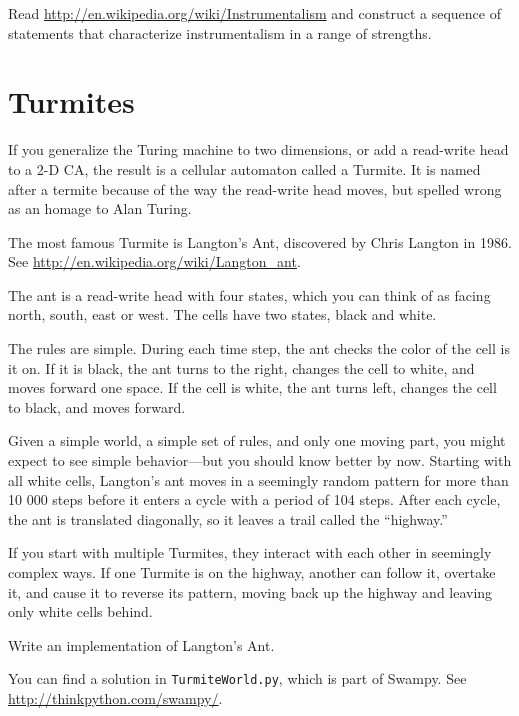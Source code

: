 \documentclass[10pt]{book}
\begin{document}
\begin{exercise}

Read \url{http://en.wikipedia.org/wiki/Instrumentalism}
and construct a sequence
of statements that characterize instrumentalism in a range of
strengths.

\end{exercise}


\section{Turmites}

If you generalize the Turing machine to two dimensions, or
add a read-write head to a 2-D CA, the result is a
cellular automaton called a Turmite.  It is named after a
termite because of the way the read-write head moves, but
spelled wrong as an homage to Alan Turing.

The most famous Turmite is Langton's Ant, discovered by Chris Langton
in 1986.  See \url{http://en.wikipedia.org/wiki/Langton_ant}.

The ant is a read-write head with
four states, which you can think of as facing north, south,
east or west.  The cells have two states, black and white.

The rules are simple.  During each time step, the ant checks the color
of the cell is it on.  If it is black, the ant turns to the right,
changes the cell to white, and moves forward one space.  If the cell
is white, the ant turns left, changes the cell to black, and moves
forward.

Given a simple world, a simple set of rules, and only one moving part,
you might expect to see simple behavior---but you should know
better by now.  Starting with all white cells, Langton's ant
moves in a seemingly random pattern for more than 10 000 steps
before it enters a cycle with a period of 104 steps.  After
each cycle, the ant is translated diagonally, so it leaves
a trail called the ``highway.''

If you start with multiple Turmites, they interact with each
other in seemingly complex ways.  If one Turmite is on the
highway, another can follow it, overtake it, and cause it to
reverse its pattern, moving back up the highway and leaving
only white cells behind.

\begin{exercise}

Write an implementation of Langton's Ant.

You can find a solution in {\tt TurmiteWorld.py}, which is
part of Swampy.  See \url{http://thinkpython.com/swampy/}.

\end{exercise}
\end{document}
